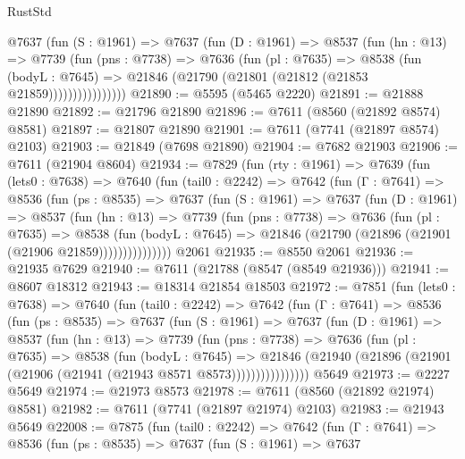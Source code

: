 \begin{lexlean}{RustStd}
\begin{coremodule}
              @7637
                (fun (S : @1961) =>
                @7637
                  (fun (D : @1961) =>
                  @8537
                    (fun (hn : @13) =>
                    @7739
                      (fun (pns : @7738) =>
                      @7636
                        (fun (pl : @7635) =>
                        @8538
                          (fun (bodyL : @7645) =>
                          @21846 (@21790 (@21801 (@21812 (@21853 @21859))))))))))))))))
@21890 := @5595 (@5465 @2220)
@21891 := @21888 @21890
@21892 := @21796 @21890
@21896 := @7611 (@8560 (@21892 @8574) @8581)
@21897 := @21807 @21890
@21901 := @7611 (@7741 (@21897 @8574) @2103)
@21903 := @21849 (@7698 @21890)
@21904 := @7682 @21903
@21906 := @7611 (@21904 @8604)
@21934 := @7829
    (fun (rty : @1961) =>
    @7639
      (fun (lets0 : @7638) =>
      @7640
        (fun (tail0 : @2242) =>
        @7642
          (fun (Γ : @7641) =>
          @8536
            (fun (ps : @8535) =>
            @7637
              (fun (S : @1961) =>
              @7637
                (fun (D : @1961) =>
                @8537
                  (fun (hn : @13) =>
                  @7739
                    (fun (pns : @7738) =>
                    @7636
                      (fun (pl : @7635) =>
                      @8538
                        (fun (bodyL : @7645) =>
                        @21846 (@21790 (@21896 (@21901 (@21906 @21859)))))))))))))))
    @2061
@21935 := @8550 @2061
@21936 := @21935 @7629
@21940 := @7611 (@21788 (@8547 (@8549 @21936)))
@21941 := @8607 @18312
@21943 := @18314 @21854 @18503
@21972 := @7851
    (fun (lets0 : @7638) =>
    @7640
      (fun (tail0 : @2242) =>
      @7642
        (fun (Γ : @7641) =>
        @8536
          (fun (ps : @8535) =>
          @7637
            (fun (S : @1961) =>
            @7637
              (fun (D : @1961) =>
              @8537
                (fun (hn : @13) =>
                @7739
                  (fun (pns : @7738) =>
                  @7636
                    (fun (pl : @7635) =>
                    @8538
                      (fun (bodyL : @7645) =>
                      @21846
                        (@21940 (@21896 (@21901 (@21906 (@21941 (@21943 @8571 @8573))))))))))))))))
    @5649
@21973 := @2227 @5649
@21974 := @21973 @8573
@21978 := @7611 (@8560 (@21892 @21974) @8581)
@21982 := @7611 (@7741 (@21897 @21974) @2103)
@21983 := @21943 @5649
@22008 := @7875
    (fun (tail0 : @2242) =>
    @7642
      (fun (Γ : @7641) =>
      @8536
        (fun (ps : @8535) =>
        @7637
          (fun (S : @1961) =>
          @7637

\end{coremodule}
\end{lexlean}

